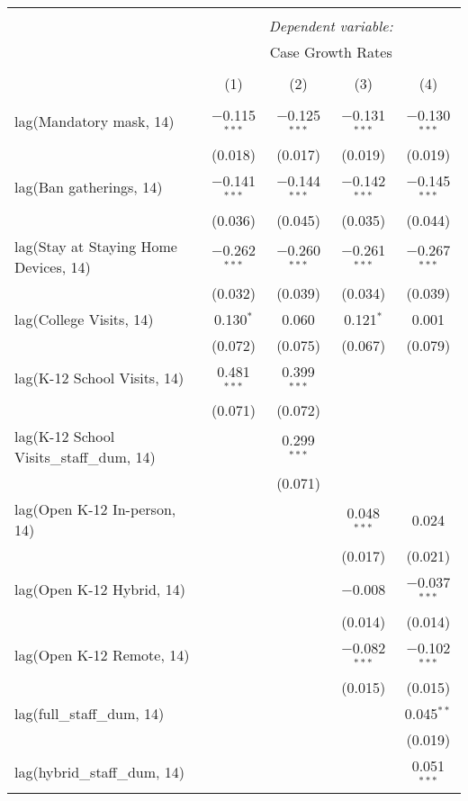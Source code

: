\begin{tabular}{@{\extracolsep{1pt}}lcccc} 
\\[-1.8ex]\hline 
\hline \\[-1.8ex] 
 & \multicolumn{4}{c}{\textit{Dependent variable:}} \\ 
\cline{2-5} 
 & \multicolumn{4}{c}{Case Growth Rates} \\ 
\\[-1.8ex] & (1) & (2) & (3) & (4)\\ 
\hline \\[-1.8ex] 
 lag(Mandatory mask, 14) & $-$0.115$^{***}$ & $-$0.125$^{***}$ & $-$0.131$^{***}$ & $-$0.130$^{***}$ \\ 
  & (0.018) & (0.017) & (0.019) & (0.019) \\ 
  lag(Ban gatherings, 14) & $-$0.141$^{***}$ & $-$0.144$^{***}$ & $-$0.142$^{***}$ & $-$0.145$^{***}$ \\ 
  & (0.036) & (0.045) & (0.035) & (0.044) \\ 
  lag(Stay at Staying Home Devices, 14) & $-$0.262$^{***}$ & $-$0.260$^{***}$ & $-$0.261$^{***}$ & $-$0.267$^{***}$ \\ 
  & (0.032) & (0.039) & (0.034) & (0.039) \\ 
  lag(College Visits, 14) & 0.130$^{*}$ & 0.060 & 0.121$^{*}$ & 0.001 \\ 
  & (0.072) & (0.075) & (0.067) & (0.079) \\ 
  lag(K-12 School Visits, 14) & 0.481$^{***}$ & 0.399$^{***}$ &  &  \\ 
  & (0.071) & (0.072) &  &  \\ 
  lag(K-12 School Visits\_staff\_dum, 14) &  & 0.299$^{***}$ &  &  \\ 
  &  & (0.071) &  &  \\ 
  lag(Open K-12 In-person, 14) &  &  & 0.048$^{***}$ & 0.024 \\ 
  &  &  & (0.017) & (0.021) \\ 
  lag(Open K-12 Hybrid, 14) &  &  & $-$0.008 & $-$0.037$^{***}$ \\ 
  &  &  & (0.014) & (0.014) \\ 
  lag(Open K-12 Remote, 14) &  &  & $-$0.082$^{***}$ & $-$0.102$^{***}$ \\ 
  &  &  & (0.015) & (0.015) \\ 
  lag(full\_staff\_dum, 14) &  &  &  & 0.045$^{**}$ \\ 
  &  &  &  & (0.019) \\ 
  lag(hybrid\_staff\_dum, 14) &  &  &  & 0.051$^{***}$ \\ 

\end{tabular}
